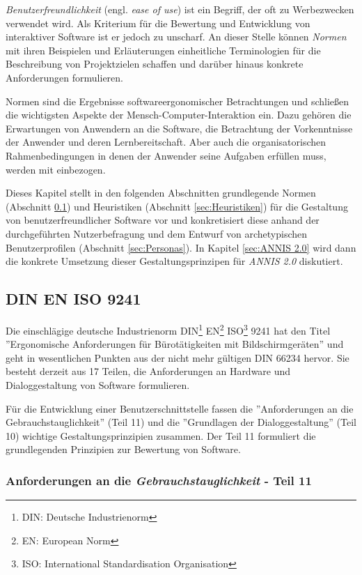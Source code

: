 \emph{Benutzerfreundlichkeit} (engl. \emph{ease of use}) ist ein Begriff, der oft zu Werbezwecken verwendet wird. Als Kriterium für die Bewertung und Entwicklung von interaktiver Software ist er jedoch zu unscharf. An dieser Stelle können \emph{Normen} mit ihren Beispielen und Erläuterungen einheitliche Terminologien für die Beschreibung von Projektzielen schaffen und darüber hinaus konkrete Anforderungen formulieren.

Normen sind die Ergebnisse softwareergonomischer Betrachtungen und schließen die wichtigsten Aspekte der Mensch-Computer-Interaktion ein. Dazu gehören die Erwartungen von Anwendern an die Software, die Betrachtung der Vorkenntnisse der Anwender und deren Lernbereitschaft. Aber auch die organisatorischen Rahmenbedingungen in denen der Anwender seine Aufgaben erfüllen muss, werden mit einbezogen.

Dieses Kapitel stellt in den folgenden Abschnitten grundlegende Normen (Abschnitt \ref{sec:Normen}) und Heuristiken (Abschnitt \ref{sec:Heuristiken}) für die Gestaltung von benutzerfreundlicher Software vor und konkretisiert diese anhand der durchgeführten Nutzerbefragung und dem Entwurf von archetypischen Benutzerprofilen (Abschnitt \ref{sec:Personas}). In Kapitel \ref{sec:ANNIS 2.0} wird dann die konkrete Umsetzung dieser Gestaltungsprinzipen für \emph{ANNIS 2.0} diskutiert.

\subsection{DIN EN ISO 9241}\label{sec:Normen}

Die einschlägige deutsche Industrienorm DIN\footnote{DIN: Deutsche Industrienorm} EN\footnote{EN: European Norm} ISO\footnote{ISO: International Standardisation Organisation} 9241 hat den Titel ''Ergonomische Anforderungen für Bürotätigkeiten mit Bildschirmgeräten'' und geht in wesentlichen Punkten aus der nicht mehr gültigen DIN 66234 hervor. Sie besteht derzeit aus 17 Teilen, die Anforderungen an Hardware und Dialoggestaltung von Software formulieren.

Für die Entwicklung einer Benutzerschnittstelle fassen die ''Anforderungen an die Gebrauchstauglichkeit'' (Teil 11) und die ''Grundlagen der Dialoggestaltung'' (Teil 10) wichtige Gestaltungsprinzipien zusammen. Der Teil 11 formuliert die grundlegenden Prinzipien zur Bewertung von Software.

\subsubsection{Anforderungen an die \emph{Gebrauchstauglichkeit} - Teil 11}

